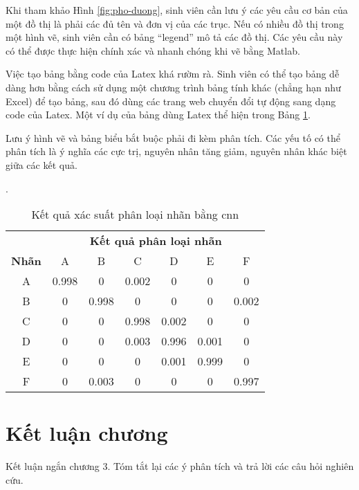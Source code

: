 Khi tham khảo Hình \ref{fig:pho-duong}, sinh viên cần lưu ý các yêu cầu cơ bản của một đồ thị là phải các đủ tên và đơn vị của các trục.
Nếu có nhiều đồ thị trong một hình vẽ, sinh viên cần có bảng ``legend'' mô tả các đồ thị.
Các yêu cầu này có thể được thực hiện chính xác và nhanh chóng khi vẽ bằng Matlab.

Việc tạo bảng bằng code của Latex khá rườm rà.
Sinh viên có thể tạo bảng dễ dàng hơn bằng cách sử dụng một chương trình bảng tính khác (chẳng hạn như Excel) để tạo bảng, sau đó dùng các trang web chuyển đổi tự động sang dạng code của Latex. 
Một ví dụ của bảng dùng Latex thể hiện trong Bảng \ref{tab:cnn}.

Lưu ý hình vẽ và bảng biểu bắt buộc phải đi kèm phân tích.
Các yếu tố có thể phân tích là ý nghĩa các cực trị, nguyên nhân tăng giảm, nguyên nhân khác biệt giữa các kết quả. 

\begin{table}[ht]
	\caption{Kết quả xác suất phân loại nhãn bằng \ac{cnn}}.
	\begin{center}
	\small
		\begin{tabular}{|c|c|c|c|c|c|c|}
			\hline
			\textbf{}&\multicolumn{6}{|c|}{\textbf{Kết quả phân loại nhãn}} \\
			\cline{2-7} 
			\textbf{Nhãn} & A& B& C& D& E& F \\
			\hline
			A& 0.998& 0& 0.002& 0& 0&	0\\
			\hline
			B& 0& 0.998& 0& 0& 0&	0.002\\
			\hline
			C& 0&	0& 0.998& 0.002& 0&	0\\
			\hline
			D& 0&	0& 0.003& 0.996& 0.001& 0\\
			\hline
			E& 0& 0& 0& 0.001& 0.999& 0\\
			\hline
			F& 0&	0.003& 0& 0& 0&	0.997\\
			\hline
		\end{tabular}
		\label{tab:cnn}
	\end{center}
\end{table}

\section{Kết luận chương}

Kết luận ngắn chương 3. 
Tóm tắt lại các ý phân tích và trả lời các câu hỏi nghiên cứu.